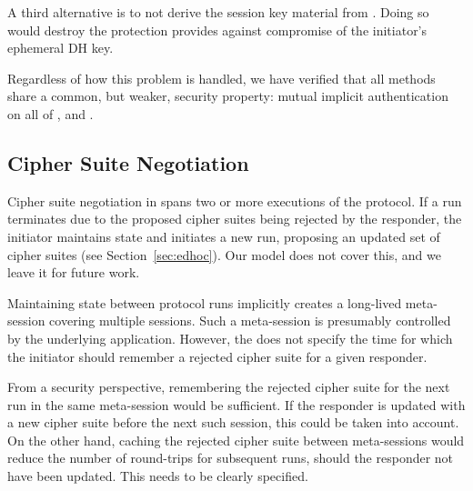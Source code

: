\documentclass[runningheads, envcountsame, a4paper, draft, x11names]{llncs}
\begin{document}
A third alternative is to not derive the session key material from \mGiy{}.
%
Doing so would destroy the protection \mOptls{} provides against compromise
of the initiator's ephemeral DH key.
%

Regardless of how this problem is handled, we have verified that all methods
share a common, but weaker, security property: mutual implicit authentication
on all of \mGxy{}, \mGiy{} and \mGrx{}.
%

\subsection{Cipher Suite Negotiation}
\label{sec:ciphersuiteNegotiation}
%
Cipher suite negotiation in \mEdhoc{} spans two or more executions of the
protocol.
%
If a run terminates due to the proposed cipher suites being rejected by the
responder, the initiator maintains state and initiates a new run, proposing
an updated set of cipher suites (see Section~\ref{sec:edhoc}).
%
Our model does not cover this, and we leave it for future work.

Maintaining state between protocol runs implicitly creates a long-lived
meta-session covering multiple \mEdhoc{} sessions.
%
Such a meta-session is presumably controlled by the underlying application.
%
However, the \mSpec{} does not specify the time for which the initiator should
remember a rejected cipher suite for a given responder.
%

From a security perspective, remembering the rejected cipher suite for the
next \mEdhoc{} run in the same meta-session would be sufficient.
%
If the responder is updated with a new cipher suite before the next such
session, this could be taken into account. On the other hand, caching the
rejected cipher suite between meta-sessions would reduce the number of
round-trips for subsequent runs, should the responder not have been updated.
%
This needs to be clearly specified.

\end{document}
